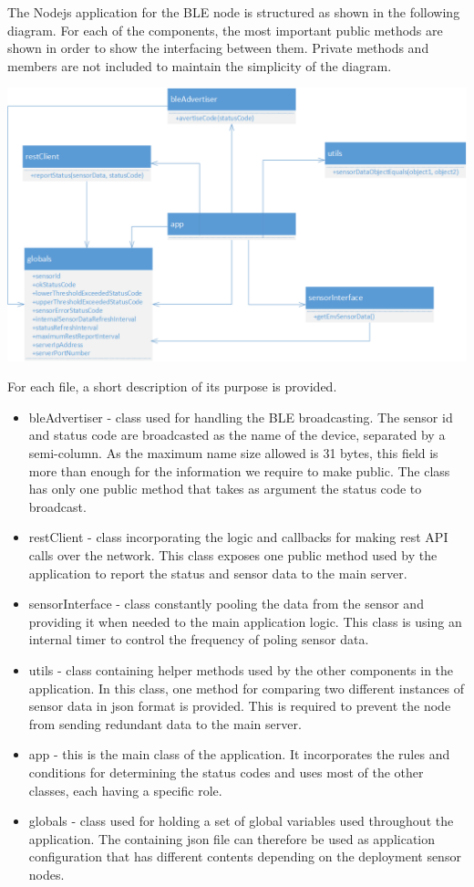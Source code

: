 The Nodejs application for the BLE node is structured as shown in the following diagram. For each of the components, the most important public methods are shown in order to show the interfacing between them. Private methods and members are not included to maintain the simplicity of the diagram.

\bigskip
\includegraphics[scale=0.6]{gfx/bleNode_architecture} 
\bigskip

For each file, a short description of its purpose is provided.
\begin{itemize}
\item bleAdvertiser - class used for handling the BLE broadcasting. The sensor id and status code are broadcasted as the name of the device, separated by a semi-column. As the maximum name size allowed is 31 bytes, this field is more than enough for the information we require to make public. The class has only one public method that takes as argument the status code to broadcast.
\item restClient - class incorporating the logic and callbacks for making rest API calls over the network. This class exposes one public method used by the application to report the status and sensor data to the main server.
\item sensorInterface - class constantly pooling the data from the sensor and providing it when needed to the main application logic. This class is using an internal timer to control the frequency of poling sensor data.
\item utils - class containing helper methods used by the other components in the application. In this class, one method for comparing two different instances of sensor data in json format is provided. This is required to prevent the node from sending redundant data to the main server.
\item app - this is the main class of the application. It incorporates the rules and conditions for determining the status codes and uses most of the other classes, each having a specific role.
\item globals - class used for holding a set of global variables used throughout the application. The containing json file can therefore be used as application configuration that has different contents depending on the deployment sensor nodes.
\end{itemize}

